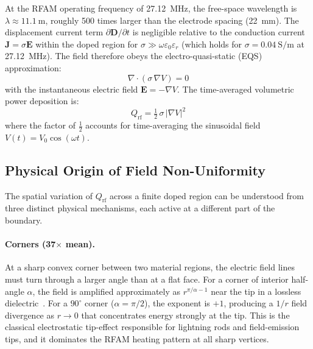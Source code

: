 \documentclass[10pt,twocolumn]{article}
\newcommand{\Qrf}{Q_{\mathrm{rf}}}
\newcommand{\vect}[1]{\boldsymbol{#1}}
\newcommand{\half}{\tfrac{1}{2}}
\begin{document}
At the RFAM operating frequency of \SI{27.12}{\mega\hertz}, the free-space
wavelength is $\lambda \approx \SI{11.1}{\meter}$, roughly 500 times
larger than the electrode spacing (\SI{22}{\milli\meter}).  The
displacement current term $\partial\vect{D}/\partial t$ is negligible
relative to the conduction current $\vect{J} = \sigma\vect{E}$ within
the doped region for $\sigma \gg \omega\varepsilon_0\varepsilon_r$
(which holds for $\sigma = \SI{0.04}{\siemens\per\meter}$ at
\SI{27.12}{\mega\hertz}).  The field therefore obeys the
electro-quasi-static (EQS) approximation:
\begin{equation}
  \nabla \cdot (\sigma\,\nabla V) = 0
  \label{eq:eqs_pde}
\end{equation}
with the instantaneous electric field $\vect{E} = -\nabla V$.  The
time-averaged volumetric power deposition is:
\begin{equation}
  \Qrf = \half\,\sigma\,|\nabla V|^{2}
  \label{eq:qrf}
\end{equation}
where the factor of $\half$ accounts for time-averaging the sinusoidal
field $V(t) = V_0\cos(\omega t)$.

\subsection{Physical Origin of Field Non-Uniformity}

The spatial variation of $\Qrf$ across a finite doped region can be
understood from three distinct physical mechanisms, each active at a
different part of the boundary.

\paragraph{Corners (37$\times$ mean).}
At a sharp convex corner between two material regions, the electric
field lines must turn through a larger angle than at a flat face.
For a corner of interior half-angle $\alpha$, the field is
amplified approximately as $r^{\pi/\alpha - 1}$ near the tip in a
lossless dielectric~\cite{Meixner1972singular}.  For a $90^\circ$
corner ($\alpha = \pi/2$), the exponent is $+1$, producing a $1/r$
field divergence as $r \to 0$ that concentrates energy strongly at
the tip.  This is the classical electrostatic tip-effect responsible
for lightning rods and field-emission tips, and it dominates the RFAM
heating pattern at all sharp vertices.
\end{document}
